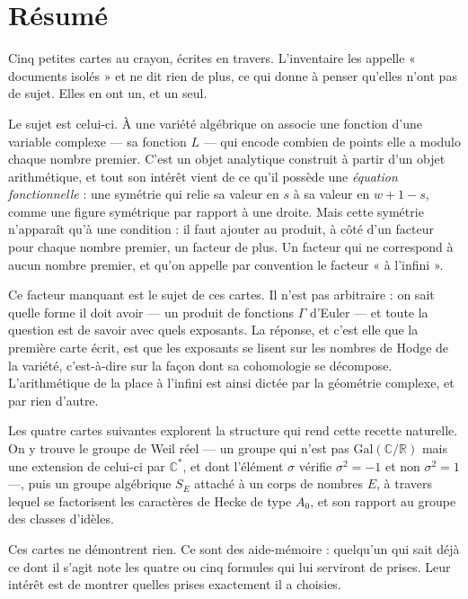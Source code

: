 \documentclass[11pt,a4paper]{article}
\begin{document}
\section*{Résumé}

\begin{resume}
Cinq petites cartes au crayon, écrites en travers. L'inventaire les appelle
« documents isolés » et ne dit rien de plus, ce qui donne à penser qu'elles
n'ont pas de sujet. Elles en ont un, et un seul.

Le sujet est celui-ci. À une variété algébrique on associe une fonction d'une
variable complexe --- sa fonction $L$ --- qui encode combien de points elle a
modulo chaque nombre premier. C'est un objet analytique construit à partir d'un
objet arithmétique, et tout son intérêt vient de ce qu'il possède une
\emph{équation fonctionnelle} : une symétrie qui relie sa valeur en $s$ à sa
valeur en $w+1-s$, comme une figure symétrique par rapport à une droite. Mais
cette symétrie n'apparaît qu'à une condition : il faut ajouter au produit, à
côté d'un facteur pour chaque nombre premier, un facteur de plus. Un facteur
qui ne correspond à aucun nombre premier, et qu'on appelle par convention le
facteur « à l'infini ».

Ce facteur manquant est le sujet de ces cartes. Il n'est pas arbitraire : on
sait quelle forme il doit avoir --- un produit de fonctions $\Gamma$ d'Euler ---
et toute la question est de savoir avec quels exposants. La réponse, et c'est
elle que la première carte écrit, est que les exposants se lisent sur les
nombres de Hodge de la variété, c'est-à-dire sur la façon dont sa cohomologie se
décompose. L'arithmétique de la place à l'infini est ainsi dictée par la
géométrie complexe, et par rien d'autre.

Les quatre cartes suivantes explorent la structure qui rend cette recette
naturelle. On y trouve le groupe de Weil réel --- un groupe qui n'est pas
$\mathrm{Gal}(\mathbb{C}/\mathbb{R})$ mais une extension de celui-ci par
$\mathbb{C}^{*}$, et dont l'élément $\sigma$ vérifie $\sigma^{2} = -1$ et non
$\sigma^{2} = 1$ ---, puis un groupe algébrique $S_{E}$ attaché à un corps de
nombres $E$, à travers lequel se factorisent les caractères de Hecke de type
$A_{0}$, et son rapport au groupe des classes d'idèles.

Ces cartes ne démontrent rien. Ce sont des aide-mémoire : quelqu'un qui sait
déjà ce dont il s'agit note les quatre ou cinq formules qui lui serviront de
prises. Leur intérêt est de montrer quelles prises exactement il a choisies.

\end{resume}
\end{document}
